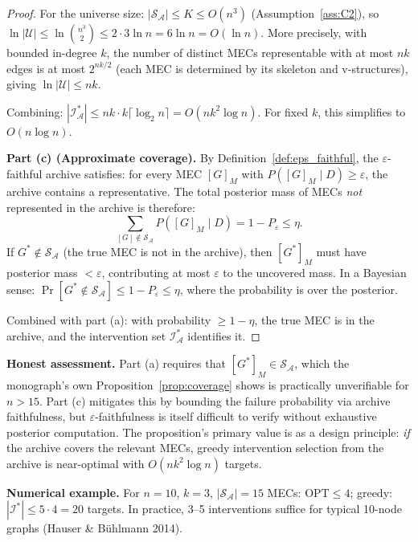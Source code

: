 \documentclass{article}
\theoremstyle{definition}
\theoremstyle{plain}
\theoremstyle{remark}
\begin{document}
\begin{proof}
For the universe size: $|\mathcal{S}_\mathcal{A}| \leq K \leq O(n^3)$
(Assumption~\ref{ass:C2}), so $\ln|\mathcal{U}| \leq \ln\binom{n^3}{2} \leq
2 \cdot 3\ln n = 6\ln n = O(\ln n)$. More precisely, with bounded in-degree $k$, the
number of distinct MECs representable with at most $nk$ edges is at most $2^{nk/2}$
(each MEC is determined by its skeleton and v-structures), giving
$\ln|\mathcal{U}| \leq nk$.

Combining: $|\mathcal{I}^*_\mathcal{A}| \leq nk \cdot k\lceil\log_2 n\rceil
= O(nk^2 \log n)$. For fixed $k$, this simplifies to $O(n \log n)$.

\textbf{Part (c) (Approximate coverage).}
By Definition~\ref{def:eps_faithful}, the $\varepsilon$-faithful archive satisfies:
for every MEC $[G]_M$ with $P([G]_M \mid D) \geq \varepsilon$, the archive contains a
representative. The total posterior mass of MECs \emph{not} represented in the archive is
therefore:
\begin{equation}
  \sum_{[G] \notin \mathcal{S}_\mathcal{A}} P([G]_M \mid D)
  = 1 - P_\varepsilon \leq \eta.
\end{equation}
If $G^* \notin \mathcal{S}_\mathcal{A}$ (the true MEC is not in the archive), then
$[G^*]_M$ must have posterior mass $< \varepsilon$, contributing at most $\varepsilon$ to
the uncovered mass. In a Bayesian sense:
$\Pr[G^* \notin \mathcal{S}_\mathcal{A}] \leq 1 - P_\varepsilon \leq \eta$,
where the probability is over the posterior.

Combined with part (a): with probability $\geq 1 - \eta$, the true MEC is in the archive,
and the intervention set $\mathcal{I}^*_\mathcal{A}$ identifies it.
\end{proof}

\textbf{Honest assessment.} Part (a) requires that $[G^*]_M \in \mathcal{S}_\mathcal{A}$,
which the monograph's own Proposition~\ref{prop:coverage} shows is practically unverifiable
for $n > 15$. Part (c) mitigates this by bounding the failure probability via archive
faithfulness, but $\varepsilon$-faithfulness is itself difficult to verify without
exhaustive posterior computation. The proposition's primary value is as a design principle:
\emph{if} the archive covers the relevant MECs, greedy intervention selection from the
archive is near-optimal with $O(nk^2 \log n)$ targets.

\textbf{Numerical example.} For $n = 10$, $k = 3$, $|\mathcal{S}_\mathcal{A}| = 15$ MECs:
$\mathrm{OPT} \leq 4$; greedy: $|\mathcal{I}^*| \leq 5 \cdot 4 = 20$ targets. In practice,
3--5 interventions suffice for typical 10-node graphs (Hauser \& Bühlmann 2014).
\end{document}
